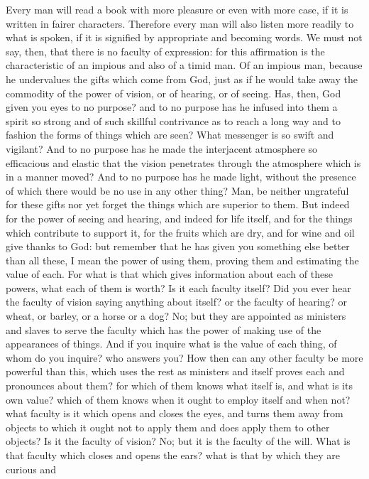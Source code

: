 \documentclass[a4paper]{article}
\begin{document}
    Every man will read a book with more pleasure or even with more case, if it
is written in fairer characters. Therefore every man will also listen more
readily to what is spoken, if it is signified by appropriate and becoming
words. We must not say, then, that there is no faculty of expression: for this
affirmation is the characteristic of an impious and also of a timid man. Of an
impious man, because he undervalues the gifts which come from God, just as if
he would take away the commodity of the power of vision, or of hearing, or of
seeing. Has, then, God given you eyes to no purpose? and to no purpose has he
infused into them a spirit so strong and of such skillful contrivance as to
reach a long way and to fashion the forms of things which are seen? What
messenger is so swift and vigilant? And to no purpose has he made the
interjacent atmosphere so efficacious and elastic that the vision penetrates
through the atmosphere which is in a manner moved? And to no purpose has he
made light, without the presence of which there would be no use in any other
thing?
    Man, be neither ungrateful for these gifts nor yet forget the things which
are superior to them. But indeed for the power of seeing and hearing, and
indeed for life itself, and for the things which contribute to support it, for
the fruits which are dry, and for wine and oil give thanks to God: but remember
that he has given you something else better than all these, I mean the power of
using them, proving them and estimating the value of each. For what is that
which gives information about each of these powers, what each of them is worth?
Is it each faculty itself? Did you ever hear the faculty of vision saying
anything about itself? or the faculty of hearing? or wheat, or barley, or a
horse or a dog? No; but they are appointed as ministers and slaves to serve the
faculty which has the power of making use of the appearances of things. And if
you inquire what is the value of each thing, of whom do you inquire? who
answers you? How then can any other faculty be more powerful than this, which
uses the rest as ministers and itself proves each and pronounces about them?
for which of them knows what itself is, and what is its own value? which of
them knows when it ought to employ itself and when not? what faculty is it
which opens and closes the eyes, and turns them away from objects to which it
ought not to apply them and does apply them to other objects? Is it the faculty
of vision? No; but it is the faculty of the will. What is that faculty which
closes and opens the ears? what is that by which they are curious and
\end{document}
